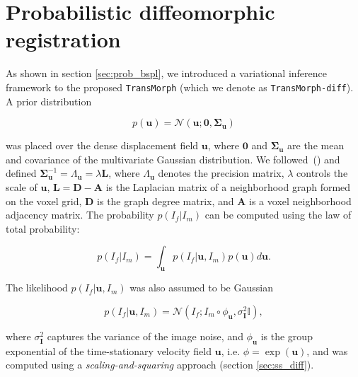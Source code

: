 \documentclass[times,twocolumn,final]{elsarticle}
\begin{document}
\section{Probabilistic diffeomorphic registration}
\label{sec:prob_diff}
As shown in section \ref{sec:prob_bspl}, we introduced a variational inference framework to the proposed \texttt{TransMorph} (which we denote as \texttt{TransMorph-diff}). A prior distribution 
\begin{linenomath}
\begin{equation}
    p(\mathbf{u})=\mathcal{N}(\mathbf{u};\mathbf{0}, \mathbf{\Sigma}_\mathbf{u})
\end{equation}
\end{linenomath} was placed over the dense displacement field $\mathbf{u}$, where $\mathbf{0}$ and $\mathbf{\Sigma}_\mathbf{u}$ are the mean and covariance of the multivariate Gaussian distribution. We followed~(\cite{dalca2019unsupervised}) and defined $\mathbf{\Sigma}_\mathbf{u}^{-1}=\Lambda_\mathbf{u}=\lambda\mathbf{L}$, where $\Lambda_\mathbf{u}$ denotes the precision matrix, $\lambda$ controls the scale of $\mathbf{u}$, $\mathbf{L}=\mathbf{D}-\mathbf{A}$ is the Laplacian matrix of a neighborhood graph formed on the voxel grid, $\mathbf{D}$ is the graph degree matrix, and $\mathbf{A}$ is a voxel neighborhood adjacency matrix. The probability $p(I_f|I_m)$ can be computed using the law of total probability:
\begin{linenomath}
\begin{equation}
\label{eqn:prob_IF_IM}
    p(I_f|I_m)=\int_{\mathbf{u}}p(I_f|\mathbf{u}, I_m)p(\mathbf{u})d\mathbf{u}.
\end{equation}
\end{linenomath}
The likelihood $p(I_f|\mathbf{u}, I_m)$ was also assumed to be Gaussian
\begin{linenomath}
\begin{equation}
    p(I_f|\mathbf{u}, I_m)=\mathcal{N}(I_f;I_m\circ\phi_\mathbf{u}, \sigma^2_\mathbf{I}\mathbb{I}),
\end{equation}
\end{linenomath}
where $\sigma^2_\mathbf{I}$ captures the variance of the image noise, and $\phi_{\mathbf{u}}$ is the group exponential of the time-stationary velocity field $\mathbf{u}$, i.e. $\phi=\exp(\mathbf{u})$, and was computed using a \textit{scaling-and-squaring} approach (section \ref{sec:ss_diff}). 
\end{document}

